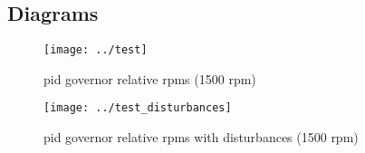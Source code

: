 \documentclass[11pt,a4paper]{article}
\begin{document}
  


\newpage
\tableofcontents
\thispagestyle{empty}
\clearpage
{}

\begin{landscape}

\section{Diagrams}
\label{sec:diags}

  \begin{figure}[H]
    \centering
    \texttt{[image: ../test]}
    \caption{pid governor relative rpms (1500 rpm)}
  \end{figure}  
\end{landscape}

\begin{landscape}
  \begin{figure}[H]
    \centering
    \texttt{[image: ../test\_disturbances]}
    \caption{pid governor relative rpms with disturbances (1500 rpm)}
    \label{fig:dist}
  \end{figure}
\end{landscape}
\end{document}
